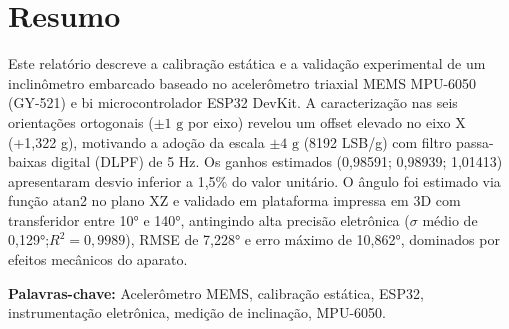 \section*{Resumo}

Este relatório descreve a calibração estática e a validação experimental de um inclinômetro embarcado baseado no acelerômetro triaxial MEMS MPU-6050 (GY-521) e bi microcontrolador ESP32 DevKit. A caracterização nas seis orientações ortogonais ($\pm 1 \text{ g}$ por eixo) revelou um offset elevado no eixo X (+1,322 g), motivando a adoção da escala $\pm 4 \text{ g}$ (8192 LSB/g) com  filtro passa-baixas digital (DLPF) de 5 Hz. Os ganhos estimados (0,98591; 0,98939; 1,01413) apresentaram desvio inferior a 1,5\% do valor unitário. O ângulo foi estimado via função atan2 no plano XZ e validado em plataforma impressa em 3D com transferidor entre 10° e 140°, antingindo alta precisão eletrônica ($\sigma$ médio de 0,129°;$R^2 = 0,9989$), RMSE de 7,228° e erro máximo de 10,862°, dominados por efeitos mecânicos do aparato. 

\vspace{0,5cm}

{\raggedright
\textbf{Palavras-chave:} Acelerômetro MEMS, calibração estática, ESP32, instrumentação eletrônica, medição de inclinação, MPU-6050.}

\vspace{0,5cm}
